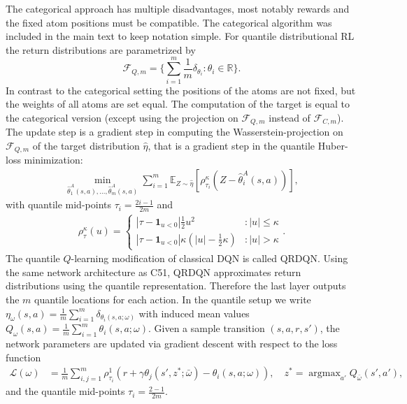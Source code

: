 \documentclass{article}
\theoremstyle{plain}
\theoremstyle{definition}
\theoremstyle{remark}
\begin{document}
The categorical approach has multiple disadvantages, most notably rewards and the fixed atom positions must be compatible. The categorical algorithm was included in the main text to keep notation simple. For quantile distributional RL the return distributions are parametrized by
\[\mathcal{F}_{Q,m} = \Big\{  \sum_{i=1}^{m}\frac{1}{m} \delta_{\theta_i} : \theta_i \in \mathbb{R} \Big\}.\]
In contrast to the categorical setting the positions of the atoms are not fixed, but the weights of all atoms are set equal. The computation of the target is equal to the categorical version (except using the projection on $\mathcal F_{Q,m}$ instead of $\mathcal F_{C,m}$). The update step is a gradient step in computing the Wasserstein-projection on $\mathcal F_{Q,m}$ of the target distribution $\hat\eta$, that is a gradient step in the quantile Huber-loss minimization:
\begin{align*}
\min_{\hat{\theta}_{1}^A(s,a),...,\hat{\theta}_{m}^A(s,a)} \sum_{i=1}^{m}\mathbb{E}_{Z \sim \hat{\eta}}[\rho_{\tau_i}^{\kappa}(Z-\hat{\theta}_{i}^A(s,a))],
\end{align*}
with quantile mid-points $\tau_i=\frac{2i-1}{2m}$ and
\begin{align*}
    \rho_{\tau}^{\kappa}(u) 
    =
    \begin{cases} 
    |\tau - \textbf{1}_{u<0}|\frac{1}{2}u^2&:|u|\leq \kappa \\
     |\tau - \textbf{1}_{u<0}|\kappa(|u|-\frac{1}{2}\kappa) &: |u|> \kappa
     \end{cases}.
\end{align*}
The quantile $Q$-learning modification of classical DQN \cite{dqn} is called QRDQN. Using the same network architecture as C51, QRDQN approximates return distributions using the quantile representation. Therefore the last layer outputs the $m$ quantile locations for each action.
In the quantile setup we write $\eta_\omega(s,a)=\frac{1}{m}\sum_{i=1}^m\delta_{\theta_i(s,a;\omega)}$ with induced mean values $Q_\omega(s,a)=\frac{1}{m}\sum_{i=1}^m\theta_i(s,a;\omega)$. Given a sample transition $(s,a,r,s')$, the network parameters are updated via gradient descent with respect to the loss function
\begin{align}\label{eq:qrdqn loss}
    \mathcal L(\omega)&=\frac{1}{m}\sum_{i,j=1}^m\rho_{\tau_i}^1(r+\gamma\theta_j(s',z^*;\bar\omega)-\theta_i(s,a;\omega)), \quad
    z^*=\operatorname{argmax}_{a'}Q_{\bar\omega}(s',a'),
\end{align}
and the quantile mid-points $\tau_i=\frac{2-1}{2m}$. 
\end{document}
